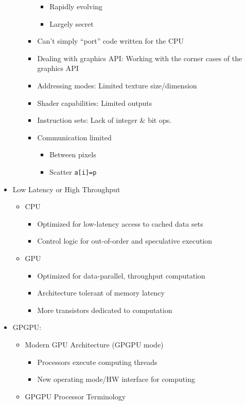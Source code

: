 \documentclass[a4paper]{article}
\newcommand{\inline}[1]{\lstinline!#1!}%
\begin{document}
\begin{itemize}
\begin{itemize}
\begin{itemize}
\begin{itemize}
\item Rapidly evolving 
\item Largely secret
\end{itemize}
\item Can't simply ``port'' code written for the CPU
\item Dealing with graphics API: Working with the corner cases of the graphics API
\item Addressing modes: Limited texture size/dimension
\item Shader capabilities: Limited outputs
\item Instruction sets: Lack of integer \& bit ops.
\item Communication limited
\begin{itemize}
\item Between pixels
\item Scatter \inline{a[i]=p}
\end{itemize}
\end{itemize}
\end{itemize}
\item Low Latency or High Throughput
\begin{itemize}
\item CPU
\begin{itemize}
\item Optimized for low-latency access to cached data sets
\item Control logic for out-of-order and speculative execution
\end{itemize}
\item GPU
\begin{itemize}
\item Optimized for data-parallel, throughput computation
\item Architecture tolerant of memory latency
\item More transistors dedicated to computation
\end{itemize}
\end{itemize}
\item GPGPU:
\begin{itemize}
\item Modern GPU Architecture (GPGPU mode)
\begin{itemize}
\item Processors execute computing threads
\item New operating mode/HW interface for computing 
\end{itemize}
	\item GPGPU Processor Terminology

\end{itemize}
\end{itemize}
\end{document}
